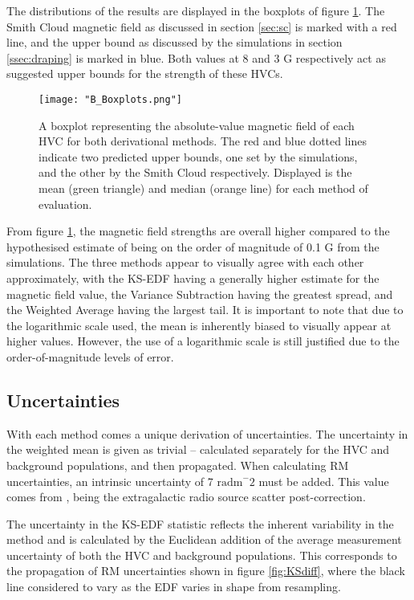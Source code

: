 The distributions of the results are displayed in the boxplots of figure \ref{fig:BBox}. The Smith Cloud magnetic field as discussed in section \ref{sec:sc} is marked with a red line, and the upper bound as discussed by the \citeauthor{ID23} simulations in section \ref{ssec:draping} is marked in blue. Both values at 8 and 3 {\textmu}G respectively act as suggested upper bounds for the strength of these HVCs.


\begin{figure}
    \texttt{[image: "B\_Boxplots.png"]}
    \centering
    \caption{A boxplot representing the absolute-value magnetic field of each HVC for both derivational methods. The red and blue dotted lines indicate two predicted upper bounds, one set by the \citeauthor{ID23} simulations, and the other by the Smith Cloud respectively. Displayed is the mean (green triangle) and median (orange line) for each method of evaluation.}
    \label{fig:BBox}
\end{figure}


From figure \ref{fig:BBox}, the magnetic field strengths are overall higher compared to the hypothesised estimate of being on the order of magnitude of 0.1 {\textmu}G from the \citeauthor{ID23} simulations. The three methods appear to visually agree with each other approximately, with the KS-EDF having a generally higher estimate for the magnetic field value, the Variance Subtraction having the greatest spread, and the Weighted Average having the largest tail. It is important to note that due to the logarithmic scale used, the mean is inherently biased to visually appear at higher values. However, the use of a logarithmic scale is still justified due to the order-of-magnitude levels of error.

\subsection{Uncertainties}
\label{ssec:results_uncertainties}

With each method comes a unique derivation of uncertainties. The uncertainty in the weighted mean is given as trivial – calculated separately for the HVC and background populations, and then propagated. When calculating RM uncertainties, an intrinsic uncertainty of 7 $\mathrm{rad m}^-2$ must be added. This value comes from \cite{ID21}, being the extragalactic radio source scatter post-correction.


The uncertainty in the KS-EDF statistic reflects the inherent variability in the method and is calculated by the Euclidean addition of the average measurement uncertainty of both the HVC and background populations. This corresponds to the propagation of RM uncertainties shown in figure \ref{fig:KSdiff}, where the black line considered to vary as the EDF varies in shape from resampling.


